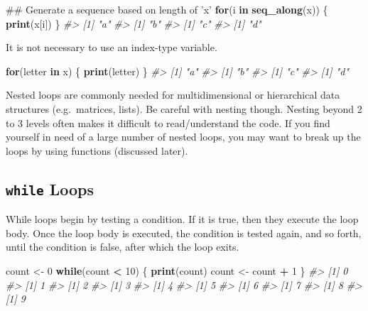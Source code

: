 \documentclass[]{book}
\newenvironment{Shaded}{\begin{snugshade}}{\end{snugshade}}
\newcommand{\KeywordTok}[1]{\textcolor[rgb]{0.13,0.29,0.53}{\textbf{#1}}}
\newcommand{\DecValTok}[1]{\textcolor[rgb]{0.00,0.00,0.81}{#1}}
\newcommand{\StringTok}[1]{\textcolor[rgb]{0.31,0.60,0.02}{#1}}
\newcommand{\CommentTok}[1]{\textcolor[rgb]{0.56,0.35,0.01}{\textit{#1}}}
\newcommand{\ControlFlowTok}[1]{\textcolor[rgb]{0.13,0.29,0.53}{\textbf{#1}}}
\newcommand{\OperatorTok}[1]{\textcolor[rgb]{0.81,0.36,0.00}{\textbf{#1}}}
\newcommand{\NormalTok}[1]{#1}
\theoremstyle{definition}
\theoremstyle{definition}
\theoremstyle{definition}
\theoremstyle{remark}
\let\BeginKnitrBlock\begin \let\EndKnitrBlock\end
\begin{document}
\begin{Shaded}
\begin{Highlighting}[]
\NormalTok{## Generate a sequence based on length of 'x'}
\ControlFlowTok{for}\NormalTok{(i }\ControlFlowTok{in} \KeywordTok{seq_along}\NormalTok{(x)) \{   }
        \KeywordTok{print}\NormalTok{(x[i])}
\NormalTok{\}}
\CommentTok{#> [1] "a"}
\CommentTok{#> [1] "b"}
\CommentTok{#> [1] "c"}
\CommentTok{#> [1] "d"}
\end{Highlighting}
\end{Shaded}

It is not necessary to use an index-type variable.

\begin{Shaded}
\begin{Highlighting}[]
\ControlFlowTok{for}\NormalTok{(letter }\ControlFlowTok{in}\NormalTok{ x) \{}
        \KeywordTok{print}\NormalTok{(letter)}
\NormalTok{\}}
\CommentTok{#> [1] "a"}
\CommentTok{#> [1] "b"}
\CommentTok{#> [1] "c"}
\CommentTok{#> [1] "d"}
\end{Highlighting}
\end{Shaded}

\BeginKnitrBlock{rmdtip}
Nested loops are commonly needed for multidimensional or hierarchical
data structures (e.g.~matrices, lists). Be careful with nesting though.
Nesting beyond 2 to 3 levels often makes it difficult to read/understand
the code. If you find yourself in need of a large number of nested
loops, you may want to break up the loops by using functions (discussed
later).
\EndKnitrBlock{rmdtip}

\subsection{\texorpdfstring{\texttt{while}
Loops}{while Loops}}\label{while-loops}

While loops begin by testing a condition. If it is true, then they
execute the loop body. Once the loop body is executed, the condition is
tested again, and so forth, until the condition is false, after which
the loop exits.

\begin{Shaded}
\begin{Highlighting}[]
\NormalTok{count <-}\StringTok{ }\DecValTok{0}
\ControlFlowTok{while}\NormalTok{(count }\OperatorTok{<}\StringTok{ }\DecValTok{10}\NormalTok{) \{}
        \KeywordTok{print}\NormalTok{(count)}
\NormalTok{        count <-}\StringTok{ }\NormalTok{count }\OperatorTok{+}\StringTok{ }\DecValTok{1}
\NormalTok{\}}
\CommentTok{#> [1] 0}
\CommentTok{#> [1] 1}
\CommentTok{#> [1] 2}
\CommentTok{#> [1] 3}
\CommentTok{#> [1] 4}
\CommentTok{#> [1] 5}
\CommentTok{#> [1] 6}
\CommentTok{#> [1] 7}
\CommentTok{#> [1] 8}
\CommentTok{#> [1] 9}
\end{Highlighting}
\end{Shaded}
\end{document}

